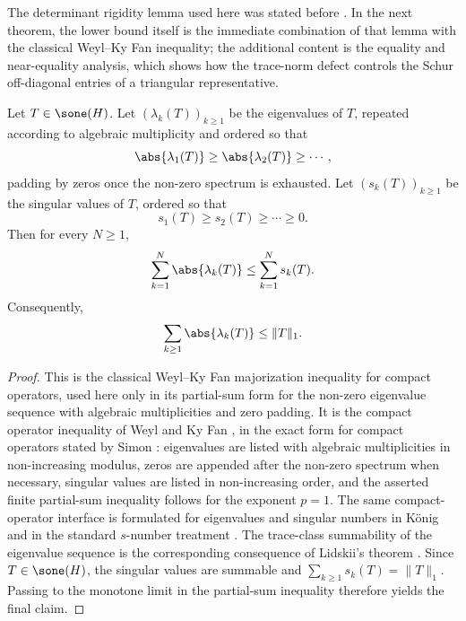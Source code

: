 The determinant rigidity lemma used here was stated before
. In the next theorem, the lower
bound itself is the immediate combination of that lemma with the classical
Weyl--Ky Fan inequality; the additional content is the equality and
near-equality analysis, which shows how the trace-norm defect controls
the Schur off-diagonal entries of a triangular representative.

\begin{lemma}
  \label{lem:weyl-ky-fan-trace-class}
Let \(T\in\sone(H)\). Let \((\lambda_k(T))_{k\ge1}\) be the eigenvalues
of \(T\), repeated according to algebraic multiplicity and ordered so
that
\[
  \abs{\lambda_1(T)}\ge \abs{\lambda_2(T)}\ge \cdots,
\]
padding by zeros once the non-zero spectrum is exhausted. Let
\((s_k(T))_{k\ge1}\) be the singular values of \(T\), ordered so that
\[
  s_1(T)\ge s_2(T)\ge \cdots \ge 0.
\]
Then for every \(N\ge1\),
\[
  \sum_{k=1}^N \abs{\lambda_k(T)}
  \le \sum_{k=1}^N s_k(T).
\]
Consequently,
\[
  \sum_{k\ge1}\abs{\lambda_k(T)}\le \|T\|_1.
\]
\end{lemma}

\begin{proof}
This is the classical Weyl--Ky Fan majorization inequality for compact
operators, used here only in its partial-sum form for the non-zero eigenvalue
sequence with algebraic multiplicities and zero padding.  It is the compact
operator inequality of Weyl and Ky Fan
\cite{Weyl1949EigenvalueInequalities,Fan1951MaximumProperties}, in the exact
form for compact operators stated by Simon
\cite[Chapter~1, Theorem~1.15]{Simon2005TraceIdeals}: eigenvalues are listed
with algebraic multiplicities in non-increasing modulus, zeros are appended
after the non-zero spectrum when necessary, singular values are listed in
non-increasing order, and the asserted finite partial-sum inequality follows
for the exponent \(p=1\).  The same compact-operator interface is formulated
for eigenvalues and singular numbers in K\"onig
\cite[Chapter~2, Section~2.a]{Konig1986EigenvalueDistribution} and in the
standard \(s\)-number treatment
\cite[Chapter~VI, Section~1]{GohbergGoldbergKaashoek1990ClassesI}.  The
trace-class summability of the eigenvalue sequence is the corresponding
consequence of Lidskii's theorem \cite[p.~485]{Lidskii1959}.
Since \(T\in\sone(H)\), the
singular values are summable and
\(\sum_{k\ge1}s_k(T)=\|T\|_1\). Passing to the monotone limit in the
partial-sum inequality therefore yields the final claim.
\end{proof}


